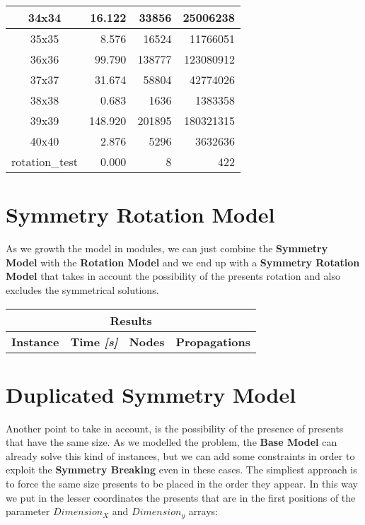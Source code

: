 \begin{center}
\begin{tabular}{|c|r|r|r|}
        34x34 & 16.122 & 33856 & 25006238 \\ \hline
        35x35 & 8.576 & 16524 & 11766051 \\ \hline
        36x36 & 99.790 & 138777 & 123080912 \\ \hline
        37x37 & 31.674 & 58804 & 42774026 \\ \hline
        38x38 & 0.683 & 1636 & 1383358 \\ \hline
        39x39 & 148.920 & 201895 & 180321315 \\ \hline
        40x40 & 2.876 & 5296 & 3632636 \\ \hline
        rotation\_test & 0.000 & 8 & 422 \\ \hline
    \end{tabular}
\end{center}

\section{Symmetry Rotation Model}
As we growth the model in modules, we can just combine the \textbf{Symmetry Model} with the \textbf{Rotation Model} and we end up
with a \textbf{Symmetry Rotation Model} that takes in account the possibility of the presents rotation and also excludes the symmetrical
solutions.

\begin{center}
    \begin{tabular}{|c|c|c|c|}
        \hline
        \multicolumn{4}{|c|}{\textbf{Results}} \\
        \hline
        \textbf{Instance} & \textbf{Time \textit{[s]}} & \textbf{Nodes} & \textbf{Propagations} \\
        \hline
    \end{tabular}
\end{center}

\section{Duplicated Symmetry Model}
Another point to take in account, is the possibility of the presence of presents that have the same size. As we modelled the problem,
the \textbf{Base Model} can already solve this kind of instances, but we can add some constraints in order to exploit the \textbf{Symmetry Breaking}
even in these cases. The simpliest approach is to force the same size presents to be placed in the order they appear. In this way we put in the lesser
coordinates the presents that are in the first positions of the parameter $Dimension_X$ and $Dimension_y$ arrays:\\

